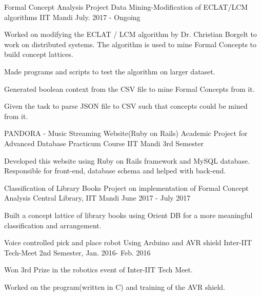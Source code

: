 \begin{cventries}
  \cventry
    {Formal Concept Analysis Project}
    {Data Mining-Modification of ECLAT/LCM algorithms}
    {IIT Mandi}
    {July. 2017 - Ongoing}
    {
      \begin{cvitems}
        \item {Worked on modifying the ECLAT / LCM algorithm by Dr. Christian Borgelt to work on
distributed systems. The algorithm is used to mine Formal Concepts to build concept
lattices.}
        \item {Made programs and scripts to test the algorithm on larger dataset. }
        \item {Generated boolean context from the CSV file to mine Formal Concepts from it. }
        \item {Given the task to parse JSON file to CSV such that concepts could be mined from it. }
      \end{cvitems}
    }
  \cventry
    {PANDORA - Music Streaming Website(Ruby on Rails)}
    {Academic Project for Advanced Database Practicum Course }
    {IIT Mandi}
    {3rd Semester}
    {
      \begin{cvitems}
        \item {Developed this website using Ruby on Rails framework and MySQL database. Responsible for front-end, database schema and helped with back-end.}
      \end{cvitems}
    }
  \cventry
    {Classification of Library Books}
    {Project on implementation of Formal Concept Analysis}
    {Central Library, IIT Mandi}
    {June 2017 - July 2017}
    {
      \begin{cvitems}
        \item {Built a concept lattice of library books using Orient DB for a more meaningful classification and arrangement.}
      \end{cvitems} 
    }
  \cventry
    {Voice controlled pick and place robot}
    {Using Arduino and AVR shield}
    {Inter-IIT Tech-Meet}
    {2nd Semester, Jan. 2016- Feb. 2016}
    {
      \begin{cvitems}
        \item {Won 3rd Prize in the robotics event of Inter-IIT Tech Meet.}
        \item {Worked on the program(written in C) and training of the AVR shield.}
      \end{cvitems}
}
\end{cventries}
